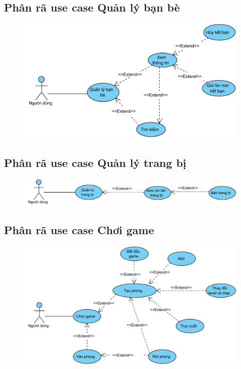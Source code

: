 \documentclass[3p]{elsarticle}
\begin{document}
\subsection{Phân rã use case Quản lý bạn bè}
\begin{figure}[!htbp]
	\hspace*{.5in}
	\centering
	\includegraphics[scale=.7]{images/usecases/gamer_FriendManagement.pdf}
\end{figure}
\newpage
\subsection{Phân rã use case Quản lý trang bị}
\begin{figure}[!htbp]
	\hspace*{-.5in}
	\centering
	\includegraphics[scale=.7]{images/usecases/gamer_ItemsManagement.pdf}
\end{figure}
\subsection{Phân rã use case Chơi game}
\begin{figure}[!htbp]
	\hspace*{.5in}
	\centering
	\includegraphics[scale=.7]{images/usecases/gamer_PlayGame.pdf}
\end{figure}
\newpage
\end{document}
